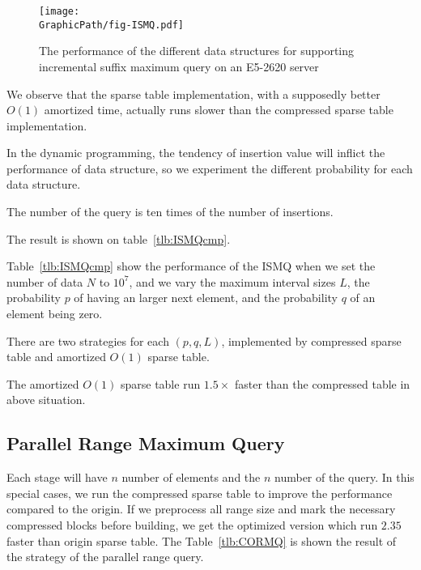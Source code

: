 \begin{figure}[!thb]
  \centering
  \texttt{[image: \\GraphicPath/fig-ISMQ.pdf]}
  \caption{The performance of the different data structures for
    supporting incremental suffix maximum query on an E5-2620 server}
  \label{fig:fig-ISMQcmp}
\end{figure}


We observe that the sparse table implementation, with a supposedly
better $O(1)$ amortized time, actually runs slower than the
compressed sparse table implementation.

In the dynamic programming, the tendency of insertion value will
inflict the performance of data structure, so we experiment the
different probability for each data structure.

The number of the query is ten times of the number of insertions.

The result is shown on table~\ref{tlb:ISMQcmp}.

Table~\ref{tlb:ISMQcmp} show the performance of the ISMQ when we set
the number of data $N$ to $10^7$, and we vary the maximum interval
sizes $L$, the probability $p$ of having an larger next element, and
the probability $q$ of an element being zero.

There are two strategies for each $(p, q, L)$, implemented by
compressed sparse table and amortized $O(1)$ sparse table.

The amortized $O(1)$ sparse table run $1.5 \times$ faster than the
compressed table in above situation.



\subsection{Parallel Range Maximum Query}

Each stage will have $n$ number of elements and the $n$ number of the
query.  In this special cases, we run the compressed sparse table to
improve the performance compared to the origin.  If we preprocess all
range size and mark the necessary compressed blocks before building, we
get the optimized version which run $2.35$ faster than origin sparse
table. The Table~\ref{tlb:CORMQ} is shown the result of the strategy of
the parallel range query.


